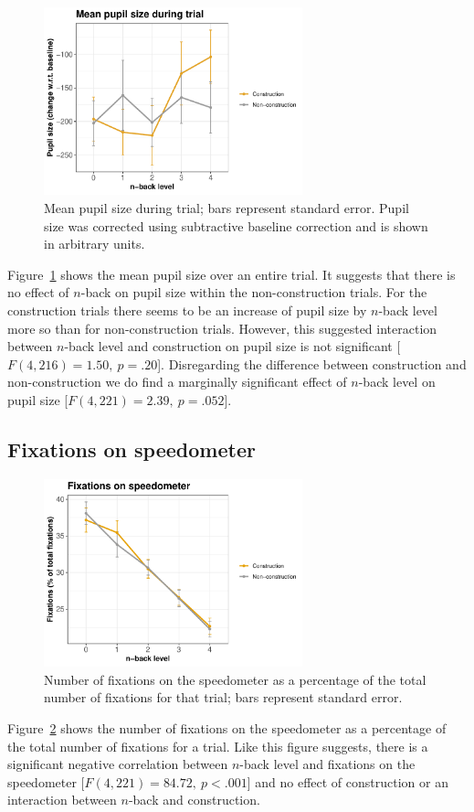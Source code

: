 \begin{figure}[tp]
  \centering
  \includegraphics[width=7.5cm]{images/pupil_size_interaction.pdf}
  \caption{Mean pupil size during trial; bars represent standard error.
  Pupil size was corrected using subtractive baseline correction and is shown in arbitrary units.}
  \label{fig:mean-ps}
\end{figure}

Figure~\ref{fig:mean-ps} shows the mean pupil size over an entire trial. 
It suggests that there is no effect of \(n\)-back on pupil size within the non-construction trials.
For the construction trials there seems to be an increase of pupil size by \(n\)-back level more so than for non-construction trials.
However, this suggested interaction between \(n\)-back level and construction on pupil size is not significant [\(F(4,216)=1.50,\ p=.20\)].
Disregarding the difference between construction and non-construction we do find a marginally significant effect of \(n\)-back level on pupil size [\(F(4,221)=2.39,\ p=.052\)].

\subsection{Fixations on speedometer}

\begin{figure}[tp]
  \centering
  \includegraphics[width=7.5cm]{images/speedometer_interaction.pdf}
  \caption{Number of fixations on the speedometer as a percentage of the total number of fixations for that trial; bars represent standard error.}
  \label{fig:fix-speedometer}
\end{figure}

Figure~\ref{fig:fix-speedometer} shows the number of fixations on the speedometer as a percentage of the total number of fixations for a trial.
Like this figure suggests, there is a significant negative correlation between \(n\)-back level and fixations on the speedometer [\(F(4,221)=84.72,\ p<.001\)] and no effect of construction or an interaction between \(n\)-back and construction. 